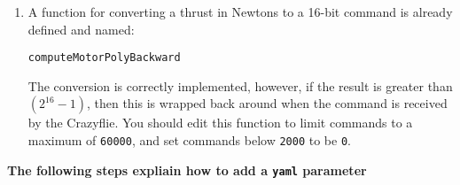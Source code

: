 \documentclass[]{report}
\newcommand{\convertnewtonsintocommandfunction}{computeMotorPolyBackward}
\begin{document}
\begin{enumerate}[topsep=-1pt , itemsep=1pt ,  label = \textbf{(\arabic{*})} ]
		\item A function for converting a thrust in Newtons to a 16-bit command is already defined and named:
		\begin{center}
			\large{\texttt{\convertnewtonsintocommandfunction}}
		\end{center}
		The conversion is correctly implemented, however, if the result is greater than ${(2^{16}\!-\!1)}$, then this is wrapped back around when the command is received by the Crazyflie. You should edit this function to limit commands to a maximum of \texttt{60000}, and set commands below \texttt{2000} to be \texttt{0}.
		
	\end{enumerate}

	\clearpage

	\begin{center}
		\textbf{The following steps expliain how to add a \texttt{yaml} parameter}
	\end{center}
	
\end{document}
